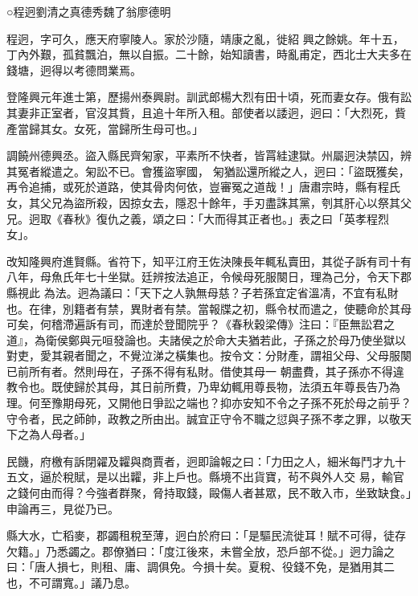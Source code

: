 
\begin{pinyinscope}

 ○程迥劉清之真德秀魏了翁廖德明



 程迥，字可久，應天府寧陵人。家於沙隨，靖康之亂，徙紹
 興之餘姚。年十五，丁內外艱，孤貧飄泊，無以自振。二十餘，始知讀書，時亂甫定，西北士大夫多在錢塘，迥得以考德問業焉。



 登隆興元年進士第，歷揚州泰興尉。訓武郎楊大烈有田十頃，死而妻女存。俄有訟其妻非正室者，官沒其貲，且追十年所入租。部使者以諉迥，迥曰：「大烈死，貲產當歸其女。女死，當歸所生母可也。」



 調饒州德興丞。盜入縣民齊匊家，平素所不快者，皆罥絓逮獄。州屬迥決禁囚，辨其冤者縱遣之。匊訟不已。會獲盜寧國，
 匊猶訟還所縱之人，迥曰：「盜既獲矣，再令追捕，或死於道路，使其骨肉何依，豈審冤之道哉！」唐肅宗時，縣有程氏女，其父兄為盜所殺，因掠女去，隱忍十餘年，手刃盡誅其黨，刳其肝心以祭其父兄。迥取《春秋》復仇之義，頌之曰：「大而得其正者也。」表之曰「英孝程烈女」。



 改知隆興府進賢縣。省符下，知平江府王佐決陳長年輒私賣田，其從子訴有司十有八年，母魚氏年七十坐獄。廷辨按法追正，令候母死服闋日，理為己分，令天下郡縣視此
 為法。迥為議曰：「天下之人孰無母慈？子若孫宜定省溫凊，不宜有私財也。在律，別籍者有禁，異財者有禁。當報牒之初，縣令杖而遣之，使聽命於其母可矣，何稽滯遍訴有司，而達於登聞院乎？《春秋穀梁傳》注曰：『臣無訟君之道』，為衛侯鄭與元咺發論也。夫諸侯之於命大夫猶若此，子孫之於母乃使坐獄以對吏，愛其親者聞之，不覺泣涕之橫集也。按令文：分財產，謂祖父母、父母服闋已前所有者。然則母在，子孫不得有私財。借使其母一
 朝盡費，其子孫亦不得違教令也。既使歸於其母，其日前所費，乃卑幼輒用尊長物，法須五年尊長告乃為理。何至豫期母死，又開他日爭訟之端也？抑亦安知不令之子孫不死於母之前乎？守令者，民之師帥，政教之所由出。誠宜正守令不職之愆與子孫不孝之罪，以敬天下之為人母者。」



 民饑，府檄有訴閉糴及糶與商賈者，迥即論報之曰：「力田之人，細米每鬥才九十五文，逼於稅賦，是以出糶，非上戶也。縣境不出貨寶，茍不與外人交
 易，輸官之錢何由而得？今強者群聚，脅持取錢，毆傷人者甚眾，民不敢入市，坐致缺食。」申論再三，見從乃已。



 縣大水，亡稻麥，郡蠲租稅至薄，迥白於府曰：「是驅民流徙耳！賦不可得，徒存欠籍。」乃悉蠲之。郡僚猶曰：「度江後來，未嘗全放，恐戶部不從。」迥力論之曰：「唐人損七，則租、庸、調俱免。今損十矣。夏稅、役錢不免，是猶用其二也，不可謂寬。」議乃息。




\end{pinyinscope}
